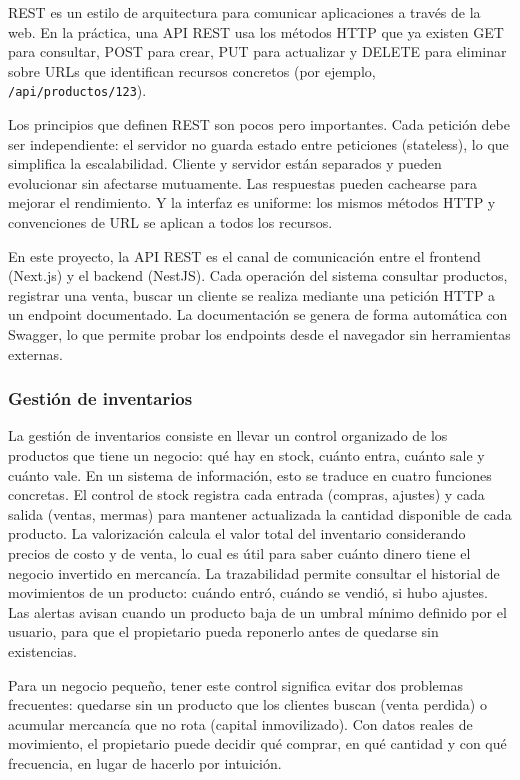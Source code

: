 \documentclass[spanish]{ieee_upb}
\begin{document}
REST es un estilo de arquitectura para comunicar aplicaciones a través de la web. En la práctica, una API REST usa los métodos HTTP que ya existen GET para consultar, POST para crear, PUT para actualizar y DELETE para eliminar  sobre URLs que identifican recursos concretos (por ejemplo, \texttt{/api/productos/123}).

Los principios que definen REST son pocos pero importantes. Cada petición debe ser independiente: el servidor no guarda estado entre peticiones (stateless), lo que simplifica la escalabilidad. Cliente y servidor están separados y pueden evolucionar sin afectarse mutuamente. Las respuestas pueden cachearse para mejorar el rendimiento. Y la interfaz es uniforme: los mismos métodos HTTP y convenciones de URL se aplican a todos los recursos.

En este proyecto, la API REST es el canal de comunicación entre el frontend (Next.js) y el backend (NestJS). Cada operación del sistema consultar productos, registrar una venta, buscar un cliente  se realiza mediante una petición HTTP a un endpoint documentado. La documentación se genera de forma automática con Swagger, lo que permite probar los endpoints desde el navegador sin herramientas externas.

\subsubsection{Gestión de inventarios}

La gestión de inventarios consiste en llevar un control organizado de los productos que tiene un negocio: qué hay en stock, cuánto entra, cuánto sale y cuánto vale. En un sistema de información, esto se traduce en cuatro funciones concretas. El control de stock registra cada entrada (compras, ajustes) y cada salida (ventas, mermas) para mantener actualizada la cantidad disponible de cada producto. La valorización calcula el valor total del inventario considerando precios de costo y de venta, lo cual es útil para saber cuánto dinero tiene el negocio invertido en mercancía. La trazabilidad permite consultar el historial de movimientos de un producto: cuándo entró, cuándo se vendió, si hubo ajustes. Las alertas avisan cuando un producto baja de un umbral mínimo definido por el usuario, para que el propietario pueda reponerlo antes de quedarse sin existencias.

Para un negocio pequeño, tener este control significa evitar dos problemas frecuentes: quedarse sin un producto que los clientes buscan (venta perdida) o acumular mercancía que no rota (capital inmovilizado). Con datos reales de movimiento, el propietario puede decidir qué comprar, en qué cantidad y con qué frecuencia, en lugar de hacerlo por intuición.
\end{document}
